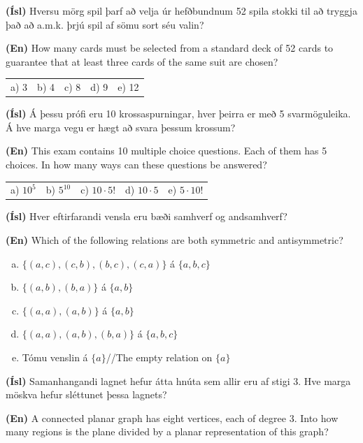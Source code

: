 \documentclass[addpoints]{exam}
\begin{document}
\begin{questions}
\question[3]

\textbf{(Ísl)} Hversu mörg spil þarf að velja úr hefðbundnum 52 spila stokki til að tryggja það að a.m.k. þrjú spil af sömu sort séu valin?

\textbf{(En)} How many cards must be selected from a standard deck of 52 cards to guarantee that at least three cards of the same suit are chosen?

\begin{tabularx}{\textwidth}{XXXXX} %
    a) 3 & b) 4 & c) 8 & d) 9 & e) 12 \\
\end{tabularx} 


\question[3] 

\textbf{(Ísl)} Á þessu prófi eru 10 krossaspurningar, hver þeirra er með 5 svarmöguleika. Á hve marga vegu er hægt að svara þessum krossum?

\textbf{(En)} This exam contains 10 multiple choice questions. Each of them has 5 choices. In how many ways can these questions be answered?

\begin{tabularx}{\textwidth}{XXXXX} %
    a) $10^5$& b) $5^{10}$& c) $10 \cdot 5!$& d) $10\cdot 5$& e) $5\cdot 10!$\\
\end{tabularx}

\question[3] 

\textbf{(Ísl)} Hver eftirfarandi vensla eru bæði samhverf og andsamhverf?

\textbf{(En)} Which of the following relations are both symmetric and antisymmetric?

\begin{enumerate}[a)]
    \item $\{(a, c), (c, b), (b, c), (c, a)\}$ á $\{a, b, c\}$
    \item $\{(a, b), (b, a)\}$ á $\{a,b\}$
    \item $\{(a, a), (a, b)\}$ á $\{a,b\}$
    \item $\{(a, a), (a, b), (b, a)\}$ á $\{a,b,c\}$
    \item Tómu venslin á $\{a\}$//The empty relation on $\{a\}$%
\end{enumerate}

\question[3] 

\textbf{(Ísl)} Samanhangandi lagnet hefur átta hnúta sem allir eru af stigi 3. Hve marga möskva hefur sléttunet þessa lagnets?

\textbf{(En)} A connected planar graph has eight vertices, each of degree 3. Into how many regions is the plane divided by a planar representation of this graph?


\end{questions}
\end{document}
